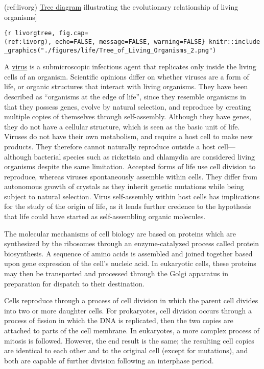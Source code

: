 \documentclass[
]{article}
\begin{document}
(ref:livorg)
\href{https://commons.wikimedia.org/wiki/File:Tree_of_Living_Organisms_2.png}{Tree
diagram} illustrating the evolutionary relationship of living
organisms{]}

\texttt{\{r\ livorgtree,\ fig.cap=\textquotesingle{}(ref:livorg)\textquotesingle{},\ echo=FALSE,\ message=FALSE,\ warning=FALSE\}\ knitr::include\_graphics("./figures/life/Tree\_of\_Living\_Organisms\_2.png")}

A \href{https://en.wikipedia.org/wiki/Virus}{virus} is a submicroscopic
infectious agent that replicates only inside the living cells of an
organism. Scientific opinions differ on whether viruses are a form of
life, or organic structures that interact with living organisms. They
have been described as ``organisms at the edge of life'', since they
resemble organisms in that they possess genes, evolve by natural
selection, and reproduce by creating multiple copies of themselves
through self-assembly. Although they have genes, they do not have a
cellular structure, which is seen as the basic unit of life. Viruses do
not have their own metabolism, and require a host cell to make new
products. They therefore cannot naturally reproduce outside a host
cell---although bacterial species such as rickettsia and chlamydia are
considered living organisms despite the same limitation. Accepted forms
of life use cell division to reproduce, whereas viruses spontaneously
assemble within cells. They differ from autonomous growth of crystals as
they inherit genetic mutations while being subject to natural selection.
Virus self-assembly within host cells has implications for the study of
the origin of life, as it lends further credence to the hypothesis that
life could have started as self-assembling organic molecules.

The molecular mechanisms of cell biology are based on proteins which are
synthesized by the ribosomes through an enzyme-catalyzed process called
protein biosynthesis. A sequence of amino acids is assembled and joined
together based upon gene expression of the cell's nucleic acid. In
eukaryotic cells, these proteins may then be transported and processed
through the Golgi apparatus in preparation for dispatch to their
destination.

Cells reproduce through a process of cell division in which the parent
cell divides into two or more daughter cells. For prokaryotes, cell
division occurs through a process of fission in which the DNA is
replicated, then the two copies are attached to parts of the cell
membrane. In eukaryotes, a more complex process of mitosis is followed.
However, the end result is the same; the resulting cell copies are
identical to each other and to the original cell (except for mutations),
and both are capable of further division following an interphase period.
\end{document}
